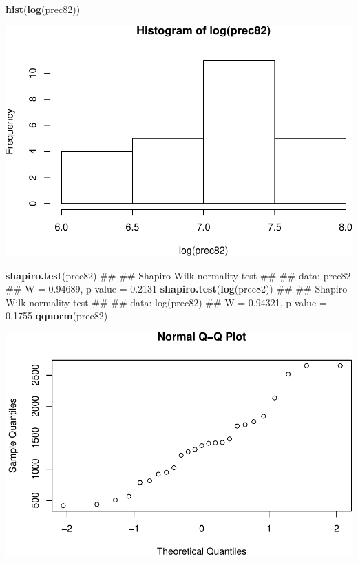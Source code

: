 \documentclass[11pt,]{article}
\newenvironment{Shaded}{\begin{snugshade}}{\end{snugshade}}
\newcommand{\KeywordTok}[1]{\textcolor[rgb]{0.13,0.29,0.53}{\textbf{#1}}}
\newcommand{\NormalTok}[1]{#1}
\begin{document}
\begin{Shaded}
\begin{Highlighting}[]
\KeywordTok{hist}\NormalTok{(}\KeywordTok{log}\NormalTok{(prec82))}
\end{Highlighting}
\end{Shaded}

\includegraphics[width=1\linewidth]{img/unnamed-chunk-12-2}

\begin{Shaded}
\begin{Highlighting}[]
\KeywordTok{shapiro.test}\NormalTok{(prec82)}
\NormalTok{## }
\NormalTok{##  Shapiro-Wilk normality test}
\NormalTok{## }
\NormalTok{## data:  prec82}
\NormalTok{## W = 0.94689, p-value = 0.2131}
\KeywordTok{shapiro.test}\NormalTok{(}\KeywordTok{log}\NormalTok{(prec82))}
\NormalTok{## }
\NormalTok{##  Shapiro-Wilk normality test}
\NormalTok{## }
\NormalTok{## data:  log(prec82)}
\NormalTok{## W = 0.94321, p-value = 0.1755}
\KeywordTok{qqnorm}\NormalTok{(prec82)}
\end{Highlighting}
\end{Shaded}

\includegraphics[width=1\linewidth]{img/unnamed-chunk-12-3}
\end{document}

